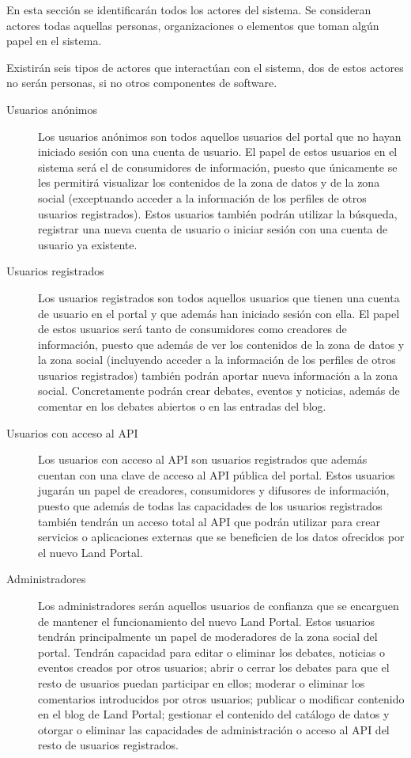 En esta sección se identificarán todos los actores del sistema.  Se consideran actores todas aquellas personas, organizaciones o elementos que toman algún papel en el sistema.

Existirán seis tipos de actores que interactúan con el sistema, dos de estos actores no serán personas, si no otros componentes de software.
\begin{description}
\item[Usuarios anónimos]  Los usuarios anónimos son todos aquellos usuarios del portal que no hayan iniciado sesión con una cuenta de usuario.  El papel de estos usuarios en el sistema será el de consumidores de información, puesto que únicamente se les permitirá visualizar los contenidos de la zona de datos y de la zona social (exceptuando acceder a la información de los perfiles de otros usuarios registrados).  Estos usuarios también podrán utilizar la búsqueda, registrar una nueva cuenta de usuario o iniciar sesión con una cuenta de usuario ya existente.
\item[Usuarios registrados]  Los usuarios registrados son todos aquellos usuarios que tienen una cuenta de usuario en el portal y que además han iniciado sesión con ella.  El papel de estos usuarios será tanto de consumidores como creadores de información, puesto que además de ver los contenidos de la zona de datos y la zona social (incluyendo acceder a la información de los perfiles de otros usuarios registrados) también podrán aportar nueva información a la zona social.  Concretamente podrán crear debates, eventos y noticias, además de comentar en los debates abiertos o en las entradas del blog.
\item[Usuarios con acceso al API]  Los usuarios con acceso al API son usuarios registrados que además cuentan con una clave de acceso al API pública del portal.  Estos usuarios jugarán un papel de creadores, consumidores y difusores de información, puesto que además de todas las capacidades de los usuarios registrados también tendrán un acceso total al API que podrán utilizar para crear servicios o aplicaciones externas que se beneficien de los datos ofrecidos por el nuevo Land Portal.
\item[Administradores]  Los administradores serán aquellos usuarios de confianza que se encarguen de mantener el funcionamiento del nuevo Land Portal.  Estos usuarios tendrán principalmente un papel de moderadores de la zona social del portal.  Tendrán capacidad para editar o eliminar los debates, noticias o eventos creados por otros usuarios; abrir o cerrar los debates para que el resto de usuarios puedan participar en ellos; moderar o eliminar los comentarios introducidos por otros usuarios; publicar o modificar contenido en el blog de Land Portal; gestionar el contenido del catálogo de datos y otorgar o eliminar las capacidades de administración o acceso al API del resto de usuarios registrados.

\end{description}
